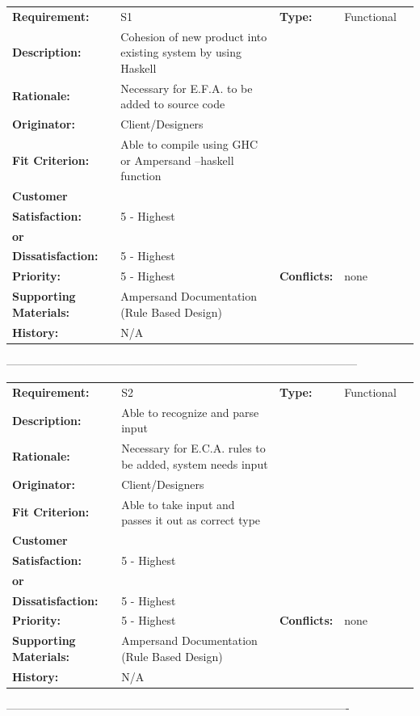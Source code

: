 \documentclass[12pt]{report}
\begin{document}
\begin{tabular}{>{\bfseries}m{3cm} m{8.5cm} >{\bfseries}m{2cm} m{3cm}l}
	Requirement:  & S1         & Type: & Functional \\ 
 Description:  & Cohesion of new product into existing system by using Haskell & &
\\	Rationale: & Necessary for E.F.A. to be added to source code & &
\\	Originator: & Client/Designers & &
\\	Fit Criterion: & Able to compile using GHC or Ampersand --haskell function & &
\\	Customer \\ Satisfaction: & 5 - Highest    \\ or&  \\ Dissatisfaction: & 5 - Highest
\\	Priority: & 5 - Highest & Conflicts: & none
\\	Supporting Materials: & Ampersand Documentation (Rule Based Design) &   & 
\\	History: & N/A & &
\end{tabular}

---------------------------------------------------------------------------------------------

\begin{tabular}{>{\bfseries}m{3cm} m{8.5cm} >{\bfseries}m{2cm} m{3cm}l}
	Requirement:  & S2         & Type: & Functional \\ 
	Description:  & Able to recognize and parse input & &
	\\	Rationale: & Necessary for E.C.A. rules to be added, system needs input & &
	\\	Originator: & Client/Designers & &
	\\	Fit Criterion: & Able to take input and passes it out as correct type & &
	\\	Customer \\ Satisfaction: & 5 - Highest    \\ or&  \\ Dissatisfaction: & 5 - Highest
	\\	Priority: & 5 - Highest & Conflicts: & none
	\\	Supporting Materials: & Ampersand Documentation (Rule Based Design) &   & 
	\\	History: & N/A & & 
\end{tabular}

-------------------------------------------------------------------------------------------
\end{document}
